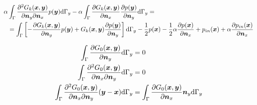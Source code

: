 \documentclass[a4paper, 10pt]{article}
\newcommand{\td}{\mathrm{d}}
\newcommand{\sx}{\bm{\mathnormal{x}}}
\newcommand{\sy}{\bm{\mathnormal{y}}}
\newcommand{\sn}{\bm{\mathnormal{n}}}
\begin{document}
\begin{align}
	\alpha & \int_\Gamma \frac{\partial^2{G}_k (\sx, \sy)}{\partial \sn_y \partial \sn_x} p(\sy) \td \Gamma_y -
	\alpha \int_\Gamma \frac{\partial{G}_k (\sx, \sy)}{\partial \sn_x} \frac{\partial p(\sy)}{\partial \sn_y} \td \Gamma_y = \nonumber \\
	& = \int_{\Gamma}\left[-\frac{\partial{G}_k (\sx, \sy)}{\partial \sn_y} p(\sy) + G_k(\sx,\sy)\frac{\partial p(\sy)}{\partial \sn_y}\right] \td \Gamma_y - \frac{1}{2} p(\sx) - \frac{1}{2}\alpha \frac{ \partial p(\sx)}{\partial \sn_x} + p_{in}(\sx) + \alpha \frac{\partial p_{in}(\sx)}{\partial \sn_x}
\end{align}

\begin{align}
	\int_\Gamma \frac{\partial G_0(\sx, \sy)}{\partial \sn_y} \td \Gamma_y & = 0 \\
	\int_\Gamma \frac{\partial^2 G_0(\sx, \sy)}{\partial \sn_x \partial \sn_y} \td \Gamma_y & = 0 \\
	\int_\Gamma \frac{\partial^2 G_0(\sx, \sy)}{\partial \sn_x \partial \sn_y}(\sy - \sx) \td \Gamma_y & = \int_\Gamma \frac{\partial G_0(\sx, \sy)}{\partial \sn_x} \sn_y \td \Gamma_y 
\end{align}
\end{document}
